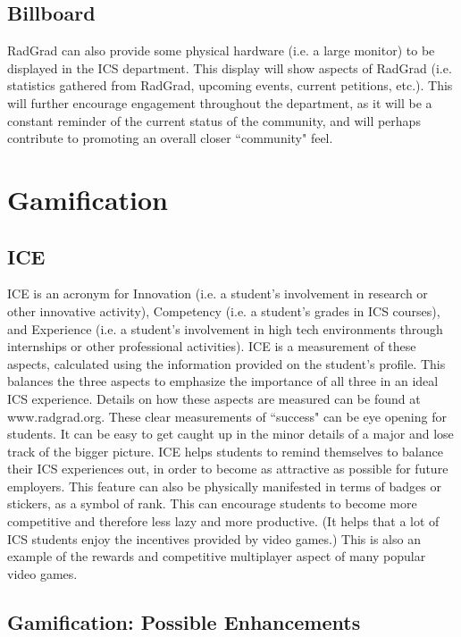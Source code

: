 \subsection{Billboard}
RadGrad can also provide some physical hardware (i.e. a large monitor) to be displayed in the ICS department. This display will show aspects of RadGrad (i.e. statistics gathered from RadGrad, upcoming events, current petitions, etc.). This will further encourage engagement throughout the department, as it will be a constant reminder of the current status of the community, and will perhaps contribute to promoting an overall closer ``community" feel. 

\section{Gamification}
\subsection{ICE}
ICE is an acronym for Innovation (i.e. a student's involvement in research or other innovative activity), Competency (i.e. a student's grades in ICS courses), and Experience (i.e. a student's involvement in high tech environments through internships or other professional activities). ICE is a measurement of these aspects, calculated using the information provided on the student's profile. This balances the three aspects to emphasize the importance of all three in an ideal ICS experience. Details on how these aspects are measured can be found at www.radgrad.org. These clear measurements of ``success" can be eye opening for students. It can be easy to get caught up in the minor details of a major and lose track of the bigger picture. ICE helps students to remind themselves to balance their ICS experiences out, in order to become as attractive as possible for future employers. This feature can also be physically manifested in terms of badges or stickers, as a symbol of rank. This can encourage students to become more competitive and therefore less lazy and more productive. (It helps that a lot of ICS students enjoy the incentives provided by video games.) This is also an example of the rewards and competitive multiplayer aspect of many popular video games. 

\subsection{Gamification: Possible Enhancements}

